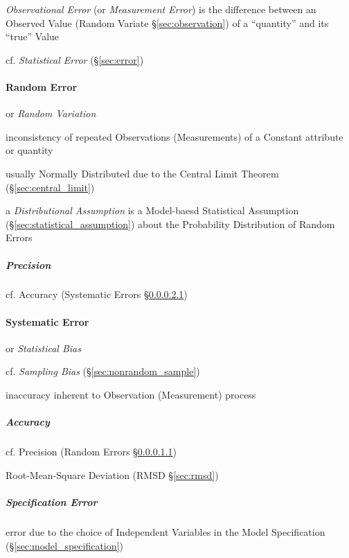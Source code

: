 \emph{Observational Error} (or \emph{Measurement Error}) is the difference
between an Observed Value (Random Variate \S\ref{sec:observation}) of a
``quantity'' and its ``true'' Value

cf. \emph{Statistical Error} (\S\ref{sec:error})



\paragraph{Random Error}\label{sec:random_error}\hfill

or \emph{Random Variation}

inconsistency of repeated Observations (Measurements) of a Constant attribute or
quantity

usually Normally Distributed due to the Central Limit Theorem
(\S\ref{sec:central_limit})

\fist a \emph{Distributional Assumption} is a Model-baesd Statistical Assumption
(\S\ref{sec:statistical_assumption}) about the Probability Distribution of
Random Errors



\subparagraph{Precision}\label{sec:precision}\hfill

cf. Accuracy (Systematic Errors \S\ref{sec:accuracy})



\paragraph{Systematic Error}\label{sec:systematic_error}\hfill

or \emph{Statistical Bias}

cf. \emph{Sampling Bias} (\S\ref{sec:nonrandom_sample})

inaccuracy inherent to Observation (Measurement) process



\subparagraph{Accuracy}\label{sec:accuracy}\hfill

cf. Precision (Random Errors \S\ref{sec:precision})

\fist Root-Mean-Square Deviation (RMSD \S\ref{sec:rmsd})



\subparagraph{Specification Error}\label{sec:specification_error}\hfill


error due to the choice of Independent Variables in the Model Specification
(\S\ref{sec:model_specification})



